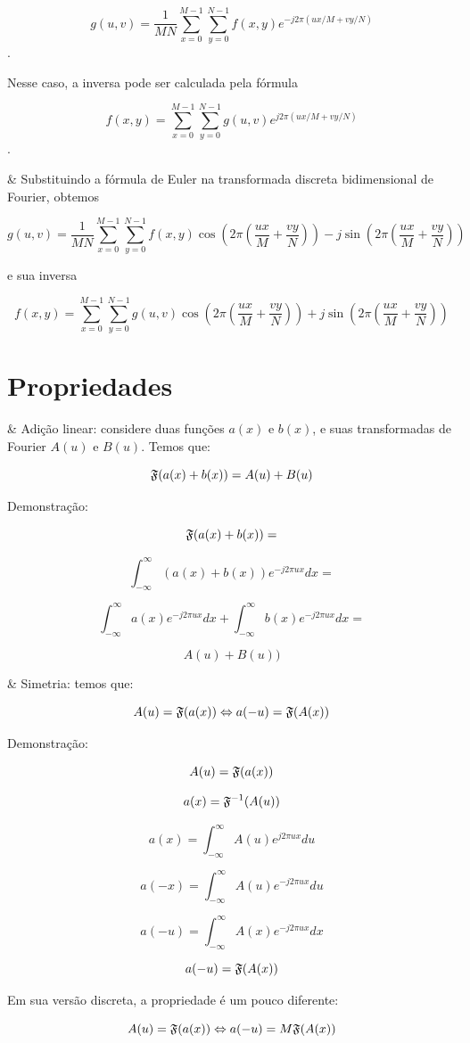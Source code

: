 \begin{easylist}
  \[ g(u, v) = \frac 1{MN} \sum^{M-1}_{x=0}\sum^{N-1}_{y=0} f(x, y) e^{-j2\pi (ux/M + vy/N)} \].

  Nesse caso, a inversa pode ser calculada pela fórmula

  \[ f(x, y) =             \sum^{M-1}_{x=0}\sum^{N-1}_{y=0} g(u, v) e^{ j2\pi (ux/M + vy/N)} \].

  
  & Substituindo a fórmula de Euler na transformada discreta bidimensional de Fourier, obtemos

  \[ g(u, v) = \frac 1{MN} \sum^{M-1}_{x=0}\sum^{N-1}_{y=0} f(x, y)
      \cos\left(2\pi \left(\frac{ux}{M} + \frac{vy}{N}\right)\right) -
     j\sin\left(2\pi \left(\frac{ux}{M} + \frac{vy}{N}\right)\right)   \]

  e sua inversa

  \[ f(x, y) =             \sum^{M-1}_{x=0}\sum^{N-1}_{y=0} g(u, v)
      \cos\left(2\pi \left(\frac{ux}{M} + \frac{vy}{N}\right)\right) +
     j\sin\left(2\pi \left(\frac{ux}{M} + \frac{vy}{N}\right)\right)   \]

\end{easylist}
  
\section{Propriedades}

\begin{easylist}

  & Adição linear: considere duas funções $a(x)$ e $b(x)$, e suas transformadas de Fourier $A(u)$ e $B(u)$. Temos que:

  \[ \mathfrak{F}(a(x) + b(x)) = A(u) + B(u) \]

  Demonstração:

  \[ \mathfrak{F}(a(x) + b(x)) = \]

  \[ \int^{\infty}_{-\infty} (a(x) + b(x)) e^{-j2\pi ux} dx = \]

  \[ \int^{\infty}_{-\infty} a(x) e^{-j2\pi ux} dx + \int^{\infty}_{-\infty} b(x) e^{-j2\pi ux} dx = \]

  \[ A(u) + B(u)) \]

  
  & Simetria: temos que:

  \[ A(u) = \mathfrak{F}(a(x)) \Leftrightarrow a(-u) = \mathfrak{F}(A(x)) \]

  Demonstração:

  \[ A(u) = \mathfrak{F}(a(x)) \]

  \[ a(x) = \mathfrak{F}^{-1}(A(u)) \]

  \[ a(x) = \int^{\infty}_{-\infty} A(u) e^{ j2\pi ux} du \]

  \[ a(-x) = \int^{\infty}_{-\infty} A(u) e^{ -j2\pi ux} du \]

  \[ a(-u) = \int^{\infty}_{-\infty} A(x) e^{ -j2\pi ux} dx \]

  \[ a(-u) = \mathfrak{F}(A(x)) \]
   
  Em sua versão discreta, a propriedade é um pouco diferente:  

  \[ A(u) = \mathfrak{F}(a(x)) \Leftrightarrow a(-u) = M \mathfrak{F}(A(x)) \]


\end{easylist}


